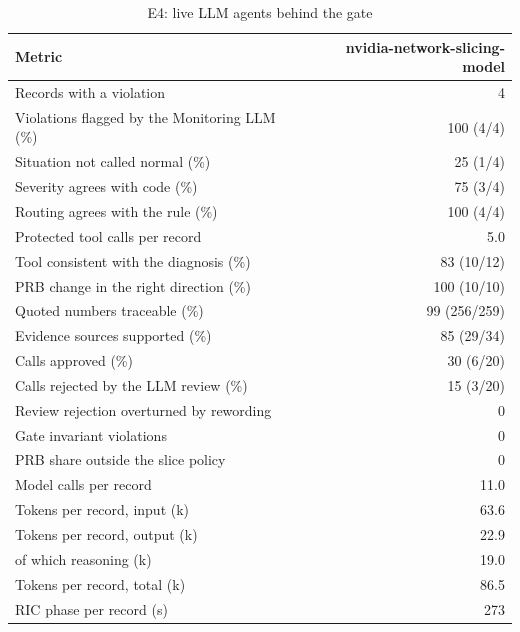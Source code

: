 \begin{table}[!t]
\centering
\caption{E4: live LLM agents behind the gate}\label{tab:live}
\footnotesize
\setlength{\tabcolsep}{3pt}
\begin{tabular}{@{}lr@{}}
\toprule
Metric & nvidia-network-slicing-model \\
\midrule
Records with a violation & 4 \\
Violations flagged by the Monitoring LLM (\%) & 100 (4/4) \\
Situation not called normal (\%) & 25 (1/4) \\
Severity agrees with code (\%) & 75 (3/4) \\
Routing agrees with the rule (\%) & 100 (4/4) \\
Protected tool calls per record & 5.0 \\
Tool consistent with the diagnosis (\%) & 83 (10/12) \\
PRB change in the right direction (\%) & 100 (10/10) \\
Quoted numbers traceable (\%) & 99 (256/259) \\
Evidence sources supported (\%) & 85 (29/34) \\
Calls approved (\%) & 30 (6/20) \\
Calls rejected by the LLM review (\%) & 15 (3/20) \\
Review rejection overturned by rewording & 0 \\
Gate invariant violations & 0 \\
PRB share outside the slice policy & 0 \\
Model calls per record & 11.0 \\
Tokens per record, input (k) & 63.6 \\
Tokens per record, output (k) & 22.9 \\
  of which reasoning (k) & 19.0 \\
Tokens per record, total (k) & 86.5 \\
RIC phase per record (s) & 273 \\
\bottomrule
\end{tabular}
\end{table}
